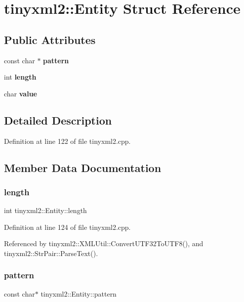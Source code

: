 \section{tinyxml2\+:\+:Entity Struct Reference}
\label{structtinyxml2_1_1_entity}
\subsection*{Public Attributes}
\begin{DoxyCompactItemize}
\item 
const char $\ast$ \textbf{ pattern}
\item 
int \textbf{ length}
\item 
char \textbf{ value}
\end{DoxyCompactItemize}


\subsection{Detailed Description}


Definition at line 122 of file tinyxml2.\+cpp.



\subsection{Member Data Documentation}
\mbox{\label{structtinyxml2_1_1_entity_a25e2b57cb59cb4fa68f283d7cb570f21}} 
\subsubsection{length}
{\footnotesize\ttfamily int tinyxml2\+::\+Entity\+::length}



Definition at line 124 of file tinyxml2.\+cpp.



Referenced by tinyxml2\+::\+X\+M\+L\+Util\+::\+Convert\+U\+T\+F32\+To\+U\+T\+F8(), and tinyxml2\+::\+Str\+Pair\+::\+Parse\+Text().

\mbox{\label{structtinyxml2_1_1_entity_ab330f5d665d29bfc811ecfa76315894b}} 
\subsubsection{pattern}
{\footnotesize\ttfamily const char$\ast$ tinyxml2\+::\+Entity\+::pattern}



